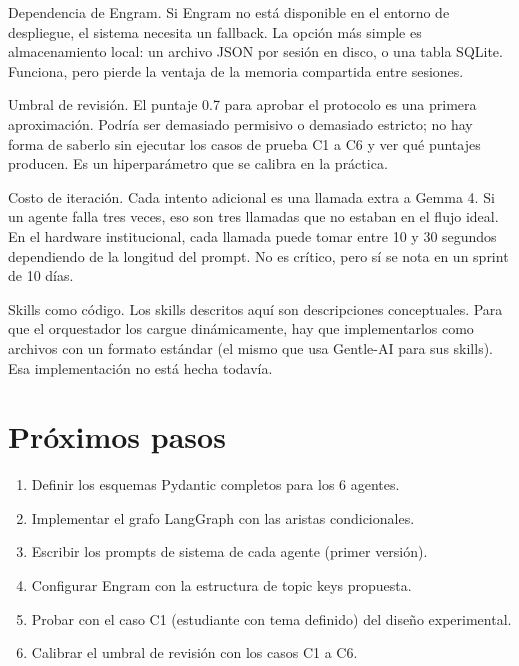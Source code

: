 \documentclass[12pt, a4paper]{article}
\begin{document}
Dependencia de Engram. Si Engram no está disponible en el entorno de
despliegue, el sistema necesita un fallback. La opción más simple es
almacenamiento local: un archivo JSON por sesión en disco, o una tabla
SQLite. Funciona, pero pierde la ventaja de la memoria compartida entre
sesiones.

Umbral de revisión. El puntaje 0.7 para aprobar el protocolo es una
primera aproximación. Podría ser demasiado permisivo o demasiado
estricto; no hay forma de saberlo sin ejecutar los casos de prueba C1
a C6 y ver qué puntajes producen. Es un hiperparámetro que se calibra
en la práctica.

Costo de iteración. Cada intento adicional es una llamada extra a Gemma 4.
Si un agente falla tres veces, eso son tres llamadas que no estaban en
el flujo ideal. En el hardware institucional, cada llamada puede tomar
entre 10 y 30 segundos dependiendo de la longitud del prompt. No es
crítico, pero sí se nota en un sprint de 10 días.

Skills como código. Los skills descritos aquí son descripciones
conceptuales. Para que el orquestador los cargue dinámicamente, hay que
implementarlos como archivos con un formato estándar (el mismo que usa
Gentle-AI para sus skills). Esa implementación no está hecha todavía.

\section{Próximos pasos}

\begin{enumerate}[leftmargin=1.5em]
    \item Definir los esquemas Pydantic completos para los 6 agentes.
    \item Implementar el grafo LangGraph con las aristas condicionales.
    \item Escribir los prompts de sistema de cada agente (primer versión).
    \item Configurar Engram con la estructura de topic keys propuesta.
    \item Probar con el caso C1 (estudiante con tema definido) del
    diseño experimental.
    \item Calibrar el umbral de revisión con los casos C1 a C6.
\end{enumerate}
\end{document}
